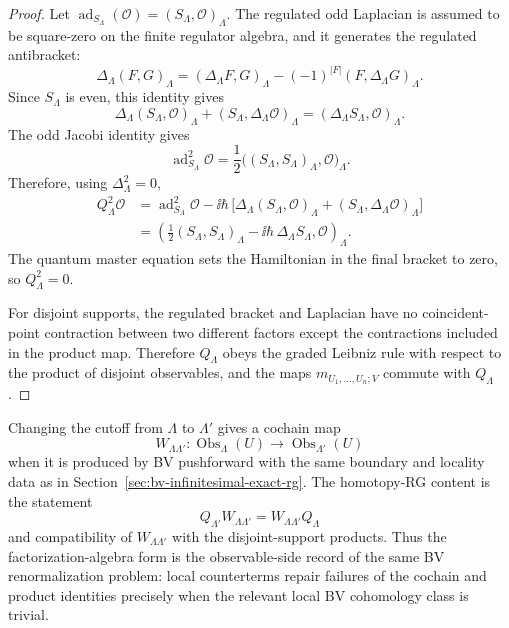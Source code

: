 \begin{proof}
Let \(\operatorname{ad}_{S_\Lambda}(\mathcal O)=(S_\Lambda,\mathcal O)_\Lambda\).
The regulated odd Laplacian is assumed to be square-zero on the finite
regulator algebra, and it generates the regulated antibracket:
\[
\Delta_\Lambda(F,G)_\Lambda
 =
(\Delta_\Lambda F,G)_\Lambda
-(-1)^{|F|}(F,\Delta_\Lambda G)_\Lambda .
\]
Since \(S_\Lambda\) is even, this identity gives
\[
  \Delta_\Lambda(S_\Lambda,\mathcal O)_\Lambda
  +(S_\Lambda,\Delta_\Lambda\mathcal O)_\Lambda
  =
  (\Delta_\Lambda S_\Lambda,\mathcal O)_\Lambda .
\]
The odd Jacobi identity gives
\[
  \operatorname{ad}_{S_\Lambda}^2\mathcal O
  =
  \frac12\bigl((S_\Lambda,S_\Lambda)_\Lambda,\mathcal O\bigr)_\Lambda .
\]
Therefore, using \(\Delta_\Lambda^2=0\),
\[
\begin{aligned}
  Q_\Lambda^2\mathcal O
  &=
  \operatorname{ad}_{S_\Lambda}^2\mathcal O
  -\ii\hbar\,
  \bigl[
    \Delta_\Lambda(S_\Lambda,\mathcal O)_\Lambda
    +(S_\Lambda,\Delta_\Lambda\mathcal O)_\Lambda
  \bigr] \\
  &=
  \left(
    \frac12(S_\Lambda,S_\Lambda)_\Lambda
    -
    \ii\hbar\,\Delta_\Lambda S_\Lambda,
    \mathcal O
  \right)_\Lambda .
\end{aligned}
\]
The quantum master equation sets the Hamiltonian in the final bracket to zero,
so \(Q_\Lambda^2=0\).

For disjoint supports, the regulated bracket and Laplacian have no
coincident-point contraction between two different factors except the
contractions included in the product map.  Therefore \(Q_\Lambda\) obeys the
graded Leibniz rule with respect to the product of disjoint observables, and
the maps \(m_{U_1,\ldots,U_n;V}\) commute with \(Q_\Lambda\).
\end{proof}

Changing the cutoff from \(\Lambda\) to \(\Lambda'\) gives a cochain map
\[
  W_{\Lambda\Lambda'}:
  \operatorname{Obs}_\Lambda(U)
  \longrightarrow
  \operatorname{Obs}_{\Lambda'}(U)
\]
when it is produced by BV pushforward with the same boundary and locality
data as in Section~\ref{sec:bv-infinitesimal-exact-rg}.  The homotopy-RG
content is the statement
\[
  Q_{\Lambda'}W_{\Lambda\Lambda'}
  =
  W_{\Lambda\Lambda'}Q_\Lambda
\]
and compatibility of \(W_{\Lambda\Lambda'}\) with the disjoint-support
products.  Thus the factorization-algebra form is the observable-side record
of the same BV renormalization problem: local counterterms repair failures of
the cochain and product identities precisely when the relevant local BV
cohomology class is trivial.

